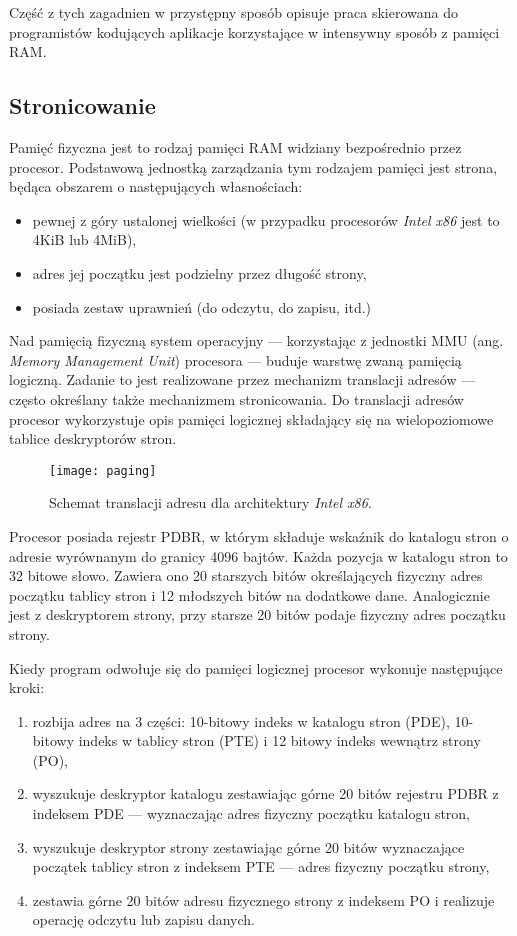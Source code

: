 \documentclass[12pt,a4paper,titlepage,twoside]{mwart}
\begin{document}
Część z tych zagadnien w przystępny sposób opisuje praca \cite{pas02memory}
skierowana do programistów kodujących aplikacje korzystające w intensywny
sposób z pamięci RAM.

\subsection{Stronicowanie}

Pamięć fizyczna jest to rodzaj pamięci RAM widziany bezpośrednio przez
procesor. Podstawową jednostką zarządzania tym rodzajem pamięci jest strona,
będąca obszarem o następujących własnościach:

\begin{itemize}
\item pewnej z góry ustalonej wielkości (w przypadku procesorów \textit{Intel
x86} jest to 4KiB lub 4MiB),
\item adres jej początku jest podzielny przez długość strony,
\item posiada zestaw uprawnień (do odczytu, do zapisu, itd.)
\end{itemize}

Nad pamięcią fizyczną system operacyjny --- korzystając z jednostki MMU (ang.
\textit{Memory Management Unit}) procesora --- buduje warstwę zwaną pamięcią
logiczną. Zadanie to jest realizowane przez mechanizm translacji adresów ---
często określany także mechanizmem stronicowania. Do translacji adresów
procesor wykorzystuje opis pamięci logicznej składający się na wielopoziomowe
tablice deskryptorów stron.

\begin{figure}[ht]
\centering
\texttt{[image: paging]}
\caption{Schemat translacji adresu dla architektury \textit{Intel x86}.}
\end{figure}

Procesor posiada rejestr PDBR, w którym składuje wskaźnik do katalogu stron o
adresie wyrównanym do granicy 4096 bajtów. Każda pozycja w katalogu stron to 32
bitowe słowo. Zawiera ono 20 starszych bitów określających fizyczny adres
początku tablicy stron i 12 młodszych bitów na dodatkowe dane.  Analogicznie
jest z deskryptorem strony, przy starsze 20 bitów podaje fizyczny adres
początku strony.

Kiedy program odwołuje się do pamięci logicznej procesor wykonuje następujące kroki:
\begin{enumerate}
\item rozbija adres na 3 części: 10-bitowy indeks w katalogu stron (PDE), 10-bitowy
indeks w tablicy stron (PTE) i 12 bitowy indeks wewnątrz strony (PO),
\item wyszukuje deskryptor katalogu zestawiając górne 20 bitów rejestru PDBR z
indeksem PDE --- wyznaczając adres fizyczny początku katalogu stron,
\item wyszukuje deskryptor strony zestawiając górne 20 bitów wyznaczające
początek tablicy stron z indeksem PTE --- adres fizyczny początku strony,
\item zestawia górne 20 bitów adresu fizycznego strony z indeksem PO i
realizuje operację odczytu lub zapisu danych.
\end{enumerate}
\end{document}

